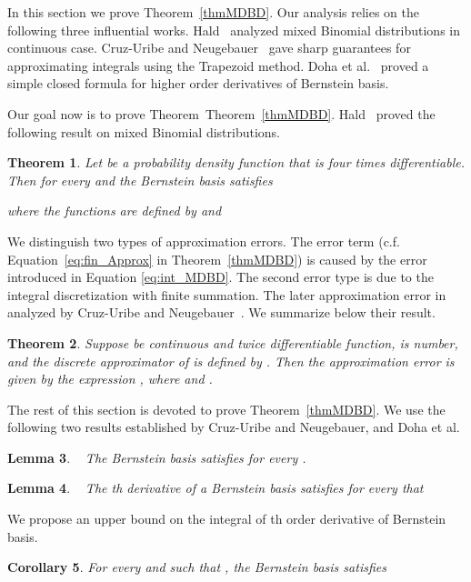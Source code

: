 \documentclass[11pt]{article}
\newtheorem{thm}{Theorem}  \newtheorem{fact}[thm]{Fact}
\newtheorem{lem}[thm]{Lemma}
\newtheorem{cor}[thm]{Corollary}
\numberwithin{thm}{section}
\begin{document}
In this section we prove Theorem~\ref{thmMDBD}. Our analysis relies on the following three influential works. Hald~\cite{Hald68} analyzed mixed Binomial distributions in continuous case. Cruz-Uribe and Neugebauer~\cite{UN03,CUN02} gave sharp guarantees for approximating integrals using the Trapezoid method. Doha et al.~\cite{DBS11} proved a simple closed formula for higher order derivatives of Bernstein basis.

Our goal now is to prove Theorem~Theorem~\ref{thmMDBD}. Hald~\cite{Hald68} proved the following result on mixed Binomial distributions.

\begin{thm}\cite{Hald68}\label{thm_Hald68}
Let  be a probability
density function that is four times differentiable. Then for every 
and  the Bernstein basis 
satisfies

where the functions are defined by 
and 
\end{thm}


We distinguish two types of approximation errors. The error term  (c.f. Equation~\ref{eq:fin_Approx} in Theorem~\ref{thmMDBD}) is caused by the error introduced in Equation \ref{eq:int_MDBD}. The second error type is due to the integral discretization with finite summation. The later approximation error in analyzed by Cruz-Uribe and Neugebauer~\cite{UN03,CUN02}. We summarize below their result.

\begin{thm}\cite{CUN02,UN03}\label{thm_approx_Def_Intergral}
Suppose  be continuous
and twice differentiable function,  is number, and the discrete
approximator of  is defined by .
Then the approximation error is given by the expression
,
where
 and .
\end{thm}


The rest of this section is devoted to prove Theorem~\ref{thmMDBD}. We use the following two results established by Cruz-Uribe and Neugebauer, and Doha et al.

\begin{lem}
\label{lem_int_n1}~\cite{CUN02,UN03} The Bernstein basis satisfies  for every .
\end{lem}

\begin{lem}
\label{lem_pder_Bni}~\cite{DBS11} The th derivative of a Bernstein
basis satisfies for every  that

\end{lem}


We propose an upper bound on the integral of th order derivative of Bernstein basis.
\begin{cor}
\label{cor_integral_derBB} For every  and
 such that ,
the Bernstein basis satisfies

\end{cor}
\end{document}
